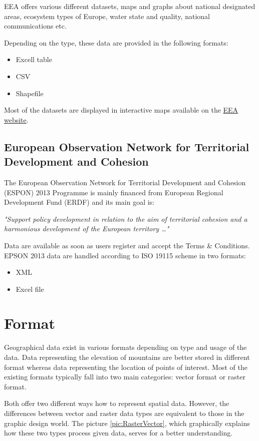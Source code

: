 \documentclass[thesis=M,english]{FITthesis}[2012/10/20]
\begin{document}
EEA offers various different datasets, maps and graphs about national designated areas, ecosystem types of Europe, water state and quality, national communications etc. 

Depending on the type, these data are provided in the following formats:
\begin{itemize}
\item Excell table
\item CSV
\item Shapefile
\end{itemize} 

Most of the datasets are displayed in interactive maps available on the \href{http://www.eea.europa.eu/data-and-maps}{EEA website}.


\subsection{European Observation Network for Territorial Development and Cohesion}
The European Observation Network for Territorial Development and Cohesion (ESPON) 2013 Programme is mainly financed from European Regional Development Fund (ERDF) and its main goal is:

\textit{"Support policy development in relation to the aim of territorial cohesion and a harmonious development of the European territory \ldots "} \cite{ESPON13}

Data are available as soon as users register and accept the Terms \& Conditions. EPSON 2013 data are handled according to ISO 19115 scheme in two formats:

\begin{itemize}
\item XML
\item Excel file
\end{itemize}

\section{Format}
Geographical data exist in various formats depending on type and usage of the data. Data representing the elevation of mountains are better stored in different format whereas data representing the location of points of interest. 
Most of the existing formats typically fall into two main categories: vector format or raster format. 

Both offer two different ways how to represent spatial data. However, the differences between vector and raster data types are equivalent to those in the graphic design world. The picture \ref{pic:RasterVector}, which graphically explains how these two types process given data, serves for a better understanding.
\end{document}
